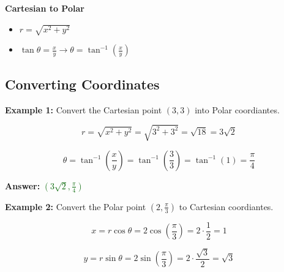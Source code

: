 \documentclass[10pt]{article}                               %
\begin{document}
\begin{adjustwidth}{2em}{0pt}
\begin{adjustwidth}{2em}{0pt}
        \vspace{0.5em}

        \textbf{Cartesian to Polar}

        \begin{itemize}
            \item \( r = \sqrt{x^2 + y^2} \)
            \item \( \tan\theta = \frac{x}{y}  \rightarrow  \theta = \tan^{-1}\left(\frac{x}{y}\right) \)
        \end{itemize}

        \vspace{0.5em}


        \begin{examplebox}

            \subsection*{Converting Coordinates}

            \textbf{Example 1:} Convert the Cartesian point \( \left(3,3\right) \) into Polar coordiantes.
            \vspace{0.5em}

            \begin{adjustwidth}{2em}{0pt}

                \[ r = \sqrt{x^2 + y^2} = \sqrt{3^2 + 3^2} = \sqrt{18} = 3\sqrt{2} \]

                \[ \theta = \tan^{-1}\left(\frac{x}{y}\right) = \tan^{-1}\left(\frac{3}{3}\right) = \tan^{-1}(1) = \frac{\pi}{4} \]

                \textbf{Answer:} \textcolor{darkgreen}{\( \left(3\sqrt{2}, \frac{\pi}{4}\right) \)}

            \end{adjustwidth}

            \vspace{1em}

            \textbf{Example 2:} Convert the Polar point \( \left(2, \frac{\pi}{3}\right) \) to Cartesian coordiantes.
            \vspace{0.5em}

            \begin{adjustwidth}{2em}{0pt}

                \[ x = r\cos\theta = 2\cos\left(\frac{\pi}{3}\right) = 2 \cdot \frac{1}{2} = 1 \]

                \[ y = r\sin\theta = 2\sin\left(\frac{\pi}{3}\right) = 2 \cdot \frac{\sqrt{3}}{2} = \sqrt{3} \]


\end{adjustwidth}
\end{examplebox}
\end{adjustwidth}
\end{adjustwidth}
\end{document}
